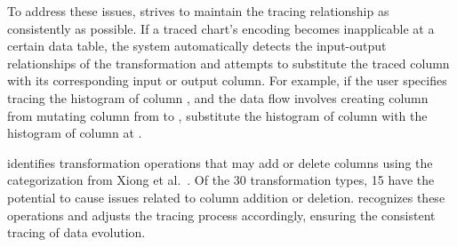 To address these issues, \system{} strives to maintain the tracing relationship as consistently as possible. 
If a traced chart's encoding becomes inapplicable at a certain data table, the system automatically detects the input-output relationships of the transformation and attempts to substitute the traced column with its corresponding input or output column. 
For example, if the user specifies tracing the histogram of column , and the data flow involves creating column  from mutating column  from  to , \system{} substitute the histogram of column  with the histogram of column  at . 

\system{} identifies transformation operations that may add or delete columns using the categorization from Xiong et al.~\cite{comantics}. Of the 30 transformation types, 15 have the potential to cause issues related to column addition or deletion. \system{} recognizes these operations and adjusts the tracing process accordingly, ensuring the consistent tracing of data evolution.